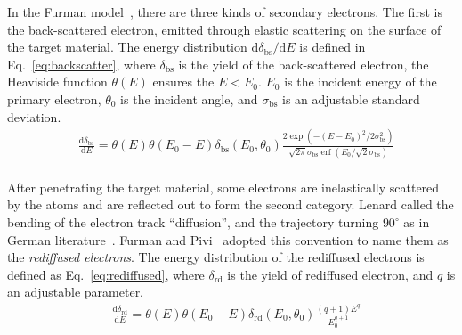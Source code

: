 In the Furman model~\cite{2002Probabilistic}, there are three kinds of secondary electrons.
The first is the back-scattered electron, emitted through elastic scattering on the surface of the target material.
The energy distribution $\mathrm{d}\delta_{\mathrm{bs}}/\mathrm{d}E$ is defined in Eq.~\eqref{eq:backscatter},
where $\delta_{\mathrm{bs}}$ is the yield of the back-scattered electron,
the Heaviside function $\theta(E)$ ensures the $E<E_0$.
$E_0$ is the incident energy of the primary electron,
$\theta_0$ is the incident angle,
and $\sigma_{\mathrm{bs}}$ is an adjustable standard deviation.
\begin{equation}
	\label{eq:backscatter}
	\begin{aligned}
		 & \frac{\mathrm{d}\delta_{\mathrm{bs}}}{\mathrm{d}E} =\theta(E) \theta\left(E_0-E\right) \delta_{\mathrm{bs}}\left(E_0, \theta_0\right)
		\frac{2 \exp \left(-\left(E-E_0\right)^2 / 2 \sigma_{\mathrm{bs}}^2\right)}{\sqrt{2 \pi} \sigma_{\mathrm{bs}}
		\operatorname{erf}\left(E_0 / \sqrt{2} \sigma_{\mathrm{bs}}\right)}                                                                      \\
	\end{aligned}
\end{equation}

After penetrating the target material, some electrons are inelastically scattered by the atoms and are reflected out to form the second category.
Lenard called the bending of the electron track ``diffusion'',
and the trajectory turning $90^\circ$ as  in German literature~\cite{bruining_physics_1954}.
Furman and Pivi~\cite{2002Probabilistic} adopted this convention to name them as the \emph{rediffused electrons}.
The energy distribution of the rediffused electrons is defined as Eq.~\eqref{eq:rediffused},
where $\delta_{\mathrm{rd}}$ is the yield of rediffused electron,
and $q$ is an adjustable parameter.
\begin{equation}
	\label{eq:rediffused}
	\begin{aligned}
		 & \frac{\mathrm{d}\delta_{\mathrm{rd}}}{\mathrm{d}E} =\theta(E) \theta\left(E_0-E\right) \delta_{\mathrm{rd}}\left(E_0, \theta_0\right) \frac{(q+1) E^q}{E_0^{q+1}} \\
	\end{aligned}
\end{equation}

